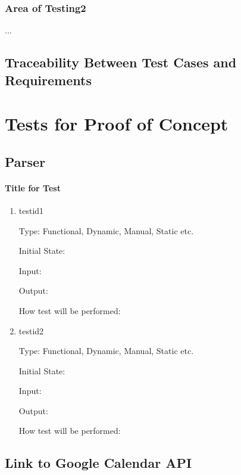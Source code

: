 \documentclass[12pt, titlepage]{article}
\begin{document}
\subsubsection{Area of Testing2}

...

\subsection{Traceability Between Test Cases and Requirements}

\section{Tests for Proof of Concept}

\subsection{Parser}
		
\paragraph{Title for Test}

\begin{enumerate}

\item{testid1\\}

Type: Functional, Dynamic, Manual, Static etc.
					
Initial State: 
					
Input: 
					
Output: 
					
How test will be performed: 
					
\item{testid2\\}

Type: Functional, Dynamic, Manual, Static etc.
					
Initial State: 
					
Input: 
					
Output: 
					
How test will be performed: 

\end{enumerate}

\subsection{Link to Google Calendar API}
\end{document}
